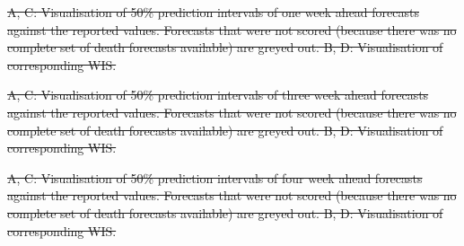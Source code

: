 \documentclass[10pt,letterpaper]{article}
\providecommand{\DIFdeltex}[1]{{\protect\color{red}\sout{#1}}}                      %
\providecommand{\DIFdelFL}[1]{\DIFdel{#1}} %
\providecommand{\DIFdel}[1]{\texorpdfstring{\DIFdeltex{#1}}{}} %
\begin{document}

{%
\DIFdelFL{A, C: Visualisation of 50\% prediction intervals of one week ahead forecasts against the reported values. Forecasts that were not scored (because there was no complete set of death forecasts available) are greyed out. B, D: Visualisation of corresponding WIS.}}%

{%
\DIFdelFL{A, C: Visualisation of 50\% prediction intervals of three week ahead forecasts against the reported values. Forecasts that were not scored (because there was no complete set of death forecasts available) are greyed out. B, D: Visualisation of corresponding WIS.}}%

{%
\DIFdelFL{A, C: Visualisation of 50\% prediction intervals of four week ahead forecasts against the reported values. Forecasts that were not scored (because there was no complete set of death forecasts available) are greyed out. B, D: Visualisation of corresponding WIS.}}%


\end{document}
